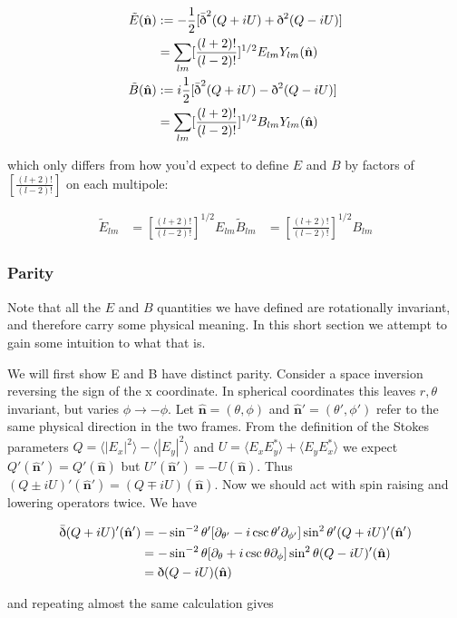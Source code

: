 \documentclass[a4paper,11pt]{article}
\renewcommand{\v}[1]{\mathbf{#1}}
\newcommand{\half}{\frac{1}{2}}
\newcommand{\unit}[1]{\hat{\v{#1}}}
\newcommand{\sr}{\text{\normalfont\dh}}
\renewcommand{\sl}{\bar{\text{\normalfont\dh}}}
\newcommand{\ltwo}{[\frac{(l+2)!}{(l-2)!}]}
\begin{document}
\begin{align}
\tilde{E}(\unit{n}) &:= -\half[\sl^2(Q+iU) + \sr^2(Q-iU)]\\
&= \sum_{lm} \ltwo^{1/2}E_{lm}Y_{lm}(\unit{n})\\
\tilde{B}(\unit{n}) &:= i\half[\sl^2(Q+iU) - \sr^2(Q-iU)]\\
&= \sum_{lm} \ltwo^{1/2}B_{lm}Y_{lm}(\unit{n})
\label{EBmodes}
\end{align}

which only differs from how you'd expect to define $E$ and $B$ by factors of $\ltwo$ on each multipole: 

\begin{align}
\tilde{E}_{lm}&=\ltwo^{1/2}E_{lm}
\tilde{B}_{lm}&=\ltwo^{1/2}B_{lm}
\label{EBtwiddle}
\end{align}

\subsubsection{Parity}

Note that all the $E$ and $B$ quantities we have defined are rotationally invariant, and therefore carry some physical meaning. In this short section we attempt to gain some intuition to what that is.

We will first show E and B have distinct parity. Consider a space inversion reversing the sign of the x coordinate. In spherical coordinates this leaves $r, \theta$ invariant, but varies $\phi \rightarrow -\phi$.  Let $\unit{n}=(\theta, \phi)$ and $\unit{n}'=(\theta', \phi')$ refer to the same physical direction in the two frames. From the definition of the Stokes parameters $Q=\langle |E_x|^2 \rangle - \langle |E_y|^2 \rangle$ and $U = \langle E_xE_y^* \rangle + \langle E_yE_x^* \rangle$ we expect $Q'(\unit{n}') = Q'(\unit{n})$ but $U'(\unit{n}') = -U(\unit{n})$. Thus $(Q\pm iU)'(\unit{n}') = (Q\mp iU)(\unit{n})$. Now we should act with spin raising and lowering operators twice. We have

\begin{align}
\sl(Q+iU)'(\unit{n}') &= -\sin^{-2}{\theta'}[\partial_{\theta'}-i\csc{\theta'}\partial_{\phi'}]\sin^{2}{\theta'}(Q+iU)'(\unit{n}')\\
&= -\sin^{-2}{\theta}[\partial_{\theta}+i\csc{\theta}\partial_{\phi}]\sin^{2}{\theta}(Q-iU)'(\unit{n})\\
&= \sr (Q-iU)(\unit{n})
\end{align}

and repeating almost the same calculation gives 
\end{document}

